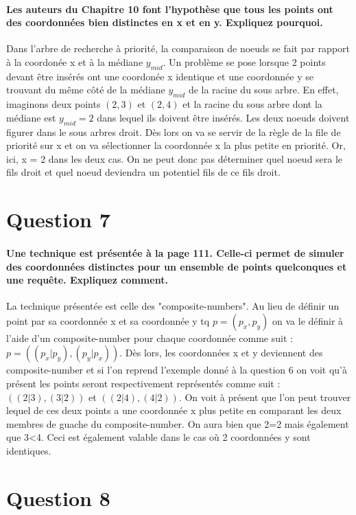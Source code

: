 \documentclass{article}
\begin{document}
    \paragraph{Les auteurs du Chapitre 10 font l’hypothèse que tous les points ont des coordonnées bien
distinctes en x et en y. Expliquez pourquoi.}
Dans l'arbre de recherche à priorité, la comparaison de noeuds se fait par rapport à la coordonée x et à la médiane $y_{mid}$. Un problème se pose lorsque 2 points devant être insérés ont une coordonée x identique et une coordonnée y se trouvant du 
même côté de la médiane $y_{mid}$ de la racine du sous arbre. En effet, imaginons deux points $(2,3)$ et $(2,4)$ et la racine du sous arbre dont la médiane est $y_{mid} = 2$ dans lequel ils doivent être insérés. Les deux noeuds doivent figurer dans
le sous arbres droit. Dès lors on va se servir de la règle de la file de priorité sur x et on va sélectionner la coordonnée x la plus petite en priorité. Or, ici, x = 2 dans les deux cas. On ne peut donc pas déterminer quel noeud sera le fils droit 
et quel noeud deviendra un potentiel fils de ce fils droit.

\section{Question 7}
    \paragraph{Une technique est présentée à la page 111. Celle-ci permet de simuler des coordonnées
distinctes pour un ensemble de points quelconques et une requête. Expliquez comment.}
La technique présentée est celle des "composite-numbers". Au lieu de définir un point par sa coordonnée x et sa coordonnée y tq $p = (p_x , p_y)$ on va le définir à l'aide
d'un composite-number pour chaque coordonnée comme suit : $p = ((p_x|p_y),(p_y|p_x))$.
Dès lors, les coordonnées x et y deviennent des composite-number et si l'on reprend l'exemple donné à la question 6 on voit qu'à présent les points seront respectivement
représentés comme suit : $((2|3), (3|2))$ et $((2|4),(4|2))$. On voit à présent que l'on peut trouver lequel de ces deux points a une coordonnée x plus petite en comparant
les deux membres de guache du composite-number. On aura bien que 2=2 mais également que 3<4. Ceci est également valable dans le cas où 2 coordonnées y sont identiques.

\section{Question 8}
\end{document}
